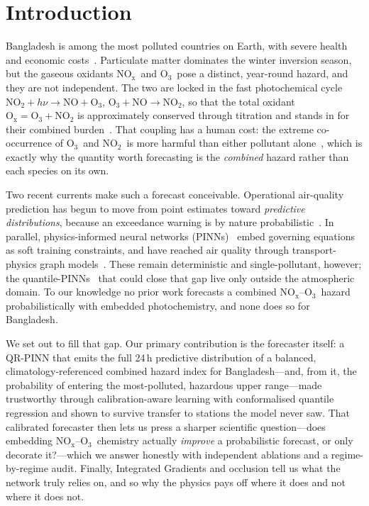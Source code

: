 \documentclass[conference]{IEEEtran}
\newcommand{\nox}{\ensuremath{\mathrm{NO_x}}}
\newcommand{\othree}{\ensuremath{\mathrm{O_3}}}
\newcommand{\notwo}{\ensuremath{\mathrm{NO_2}}}
\newcommand{\ox}{\ensuremath{\mathrm{O_x}}}
\begin{document}
\section{Introduction}
Bangladesh is among the most polluted countries on Earth, with severe health and economic
costs~\cite{worldbank2022}. Particulate matter dominates the winter inversion
season, but the gaseous oxidants \nox\ and \othree\ pose a distinct, year-round
hazard, and they are not independent. The two are locked in the fast photochemical cycle
$\notwo+h\nu\!\rightarrow\!\mathrm{NO}+\othree$, $\othree+\mathrm{NO}\!\rightarrow\!\notwo$, so that
the total oxidant $\ox=\othree+\notwo$ is approximately conserved through titration and stands in
for their combined burden~\cite{seinfeld2016}. That coupling has a human cost: the extreme
co-occurrence of \othree\ and \notwo\ is more harmful than either pollutant alone~\cite{fu2022}, which
is exactly why the quantity worth forecasting is the \emph{combined} hazard rather than each species
on its own.

Two recent currents make such a forecast conceivable. Operational air-quality prediction has begun to
move from point estimates toward \emph{predictive distributions}, because an exceedance warning is by
nature probabilistic~\cite{perezvasseur2021}. In parallel, physics-informed neural networks
(PINNs)~\cite{raissi2019,karniadakis2021} embed governing equations as soft training constraints, and
have reached air quality through transport-physics graph models~\cite{hettige2024}. These remain
deterministic and single-pollutant, however; the quantile-PINNs~\cite{hu2025} that could close that gap
live only outside the atmospheric domain. To our
knowledge no prior work forecasts a combined \nox--\othree\ hazard probabilistically with embedded
photochemistry, and none does so for Bangladesh.

We set out to fill that gap. Our primary contribution is the forecaster itself: a QR-PINN that emits the
full 24\,h predictive distribution of a balanced, climatology-referenced combined hazard index for
Bangladesh---and, from it, the probability of entering the most-polluted, hazardous upper range---made
trustworthy through calibration-aware learning with conformalised quantile regression and shown to
survive transfer to stations the model never saw. That calibrated forecaster then lets us press a sharper
scientific question---does embedding \nox--\othree\ chemistry actually \emph{improve} a probabilistic
forecast, or only decorate it?---which we answer honestly with independent ablations and a
regime-by-regime audit. Finally, Integrated Gradients and occlusion tell us what the network truly relies
on, and so why the physics pays off where it does and not where it does not.
\end{document}
